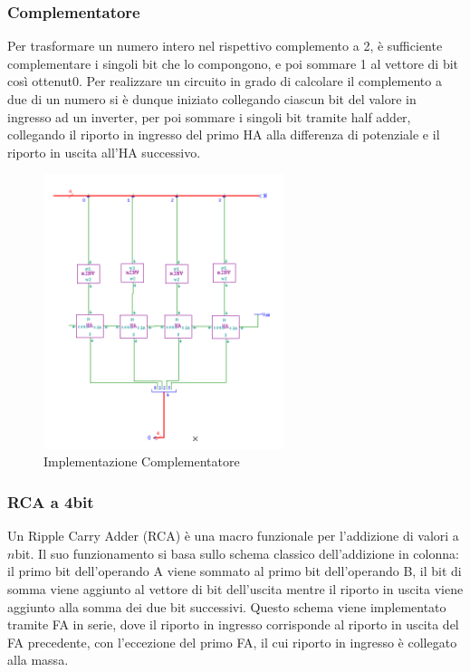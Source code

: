 \documentclass[10pt]{article}
\begin{document}
\begin{itemize}
\subsubsection{Complementatore}
Per trasformare un numero intero nel rispettivo complemento a 2, è sufficiente complementare i singoli bit che lo compongono, e poi sommare 1 al vettore di bit così ottenut0.
Per realizzare un circuito in grado di calcolare il complemento a due di un numero si è dunque iniziato collegando ciascun bit del valore in ingresso ad un inverter, per poi sommare
i singoli bit tramite half adder, collegando il riporto in ingresso del primo HA alla differenza di potenziale e il riporto in uscita all'HA successivo.

\begin{figure}[H]
    \begin{minipage}[c]{\textwidth}
    \centering    
    \includegraphics[width=70mm]{complementoadue}
    \caption{Implementazione Complementatore}
    \label{ }
    \end{minipage}
\end{figure}


\subsubsection{RCA a 4bit}
Un Ripple Carry Adder (RCA) è una macro funzionale per l'addizione di valori a $n$bit. Il suo funzionamento si basa sullo schema classico dell'addizione in colonna: il primo bit
dell'operando A viene sommato al primo bit dell'operando B, il bit di somma viene aggiunto al vettore di bit dell'uscita mentre il riporto in uscita viene aggiunto alla somma dei due bit successivi.
Questo schema viene implementato tramite FA in serie, dove il riporto in ingresso corrisponde al riporto in uscita del FA precedente, con l'eccezione del primo FA, il cui riporto in ingresso è
collegato alla massa.


\end{itemize}
\end{document}

